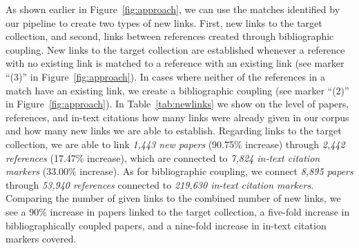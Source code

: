 As shown earlier in Figure~\ref{fig:approach}, we can use the matches identified by our pipeline to create two types of new links. First, new links to the target collection, and second, links between references created through bibliographic coupling. New links to the target collection are established whenever a reference with no existing link is matched to a reference with an existing link (see marker ``(3)'' in Figure~\ref{fig:approach}). In cases where neither of the references in a match have an existing link, we create a bibliographic coupling (see marker ``(2)''  in Figure~\ref{fig:approach}).
In Table~\ref{tab:newlinks} we show on the level of papers, references, and in-text citations how many links were already given in our corpus and how many new links we are able to establish. Regarding links to the target collection, we are able to link \emph{1,443 new papers} (90.75\% increase) through \emph{2,442 references} (17.47\% increase), which are connected to \emph{7,824 in-text citation markers} (33.00\% increase). As for bibliographic coupling, we connect \emph{8,895 papers} through \emph{53,940 references} connected to \emph{219,630 in-text citation markers}. Comparing the number of given links to the combined number of new links, we see a 90\% increase in papers linked to the target collection, a five-fold increase in bibliographically coupled papers, and a nine-fold increase in in-text citation markers covered.


